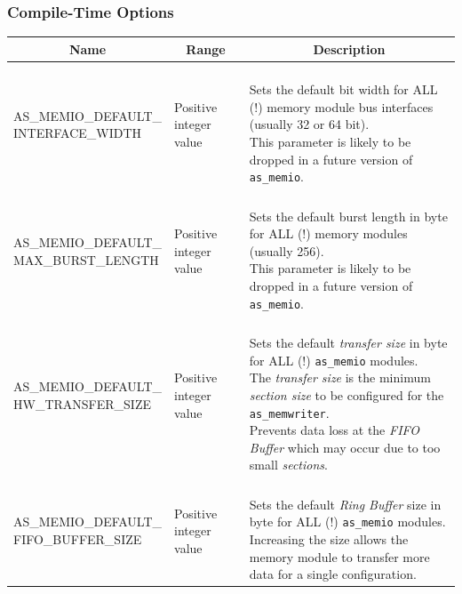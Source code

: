 \subsubsection{Compile-Time Options}\label{ch:07-basic-modules-as_memio-options}
\begin{longtable}[ht]{|l|l|l|}
    \hline
    \multicolumn{1}{|c|}{\textbf{Name}} & \multicolumn{1}{c|}{\textbf{Range}} & \multicolumn{1}{c|}{\textbf{Description}}\\
    \hline
    
    \parbox{5cm}{\small{AS\_MEMIO\_DEFAULT\_}\\\small{INTERFACE\_WIDTH}} & Positive integer value & \parbox{5cm}{\ \\
        Sets the default bit width for ALL (!) memory module bus interfaces (usually 32 or 64 bit).\\
        This parameter is likely to be dropped in a future version of \texttt{as\_memio}.\\
    }\\
    \hline
    
    \parbox{5cm}{\small{AS\_MEMIO\_DEFAULT\_}\\\small{MAX\_BURST\_LENGTH}} & Positive integer value & \parbox{5cm}{\ \\
        Sets the default burst length in byte for ALL (!) memory modules (usually 256).\\
        This parameter is likely to be dropped in a future version of \texttt{as\_memio}.\\
    }\\
    \hline
    
    \parbox{5cm}{\small{AS\_MEMIO\_DEFAULT\_}\\\small{HW\_TRANSFER\_SIZE}} & Positive integer value & \parbox{5cm}{\ \\
        Sets the default \textit{transfer size} in byte for ALL (!) \texttt{as\_memio} modules.\\
        The \textit{transfer size} is the minimum \textit{section size} to be configured for the \texttt{as\_memwriter}.\\
        Prevents data loss at the \textit{FIFO Buffer} which may occur due to too small \textit{sections}.\\
    }\\
    \hline
    
    \parbox{5cm}{\small{AS\_MEMIO\_DEFAULT\_}\\\small{FIFO\_BUFFER\_SIZE}} & Positive integer value & \parbox{5cm}{\ \\
        Sets the default \textit{Ring Buffer} size in byte for ALL (!) \texttt{as\_memio} modules.\\
        Increasing the size allows the memory module to transfer more data for a single configuration.\\
    }\\
    \hline
    
\end{longtable}

